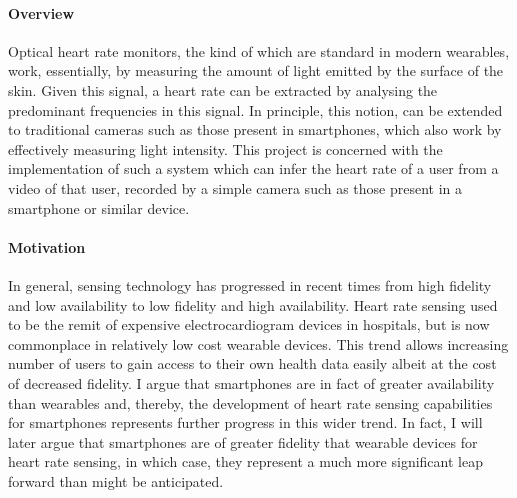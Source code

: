 \paragraph{Overview}
Optical heart rate monitors, the kind of which are standard in modern wearables,
work, essentially, by measuring the amount of light emitted by the surface of the skin.
Given this signal, a heart rate can be extracted by analysing the predominant frequencies in this signal. In principle, 
this notion, can be extended to traditional cameras such as those present in smartphones, which also work by effectively measuring light intensity.
This project is concerned with the implementation of such a system which can infer the heart rate of a user from a video of that user, recorded by a simple camera such as those
present in a smartphone or similar device.

\paragraph{Motivation}
In general, sensing technology has progressed in recent times from high fidelity and low availability to low fidelity and high availability.
Heart rate sensing used to be the remit of expensive electrocardiogram devices in hospitals, but is now commonplace in relatively low cost wearable devices.
This trend allows increasing number of users to gain access to their own health data easily albeit at the cost of decreased fidelity.
I argue that smartphones are in fact of greater availability than wearables and, thereby, the development of heart rate sensing capabilities for 
smartphones represents further progress in this wider trend. 
In fact, I will later argue that smartphones are of greater fidelity that wearable devices for heart rate sensing, in which case, they represent a much more significant 
leap forward than might be anticipated.

